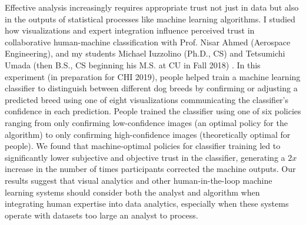 \documentclass[11pt]{article}
\begin{document}
Effective analysis increasingly requires appropriate trust not just in data but also in the outputs of statistical processes like machine learning algorithms. 
I studied how visualizations and expert integration influence perceived trust in collaborative human-machine classification with Prof. Nisar Ahmed (Aerospace Engineering), and my students Michael Iuzzolino (Ph.D., CS) and Tetsumichi Umada (then B.S., CS beginning his M.S. at CU in Fall 2018) \cite{iuzzolino2019CHI}. In this experiment (in preparation for CHI 2019), people helped train a machine learning classifier to distinguish between different dog breeds by confirming or adjusting a predicted breed using one of eight visualizations communicating the classifier's confidence in each prediction. 
People trained the classifier using one of six policies ranging from only confirming low-confidence images (an optimal policy for the algorithm) to only confirming high-confidence images (theoretically optimal for people). We found that machine-optimal policies for classifier training led to significantly lower subjective and objective trust in the classifier, generating a $2x$ increase in the number of times participants corrected the machine outputs. Our results suggest that visual analytics and other human-in-the-loop machine learning systems should consider both the analyst and algorithm when integrating human expertise into data analytics, especially when these systems operate with datasets too large an analyst to process. 


\end{document}
